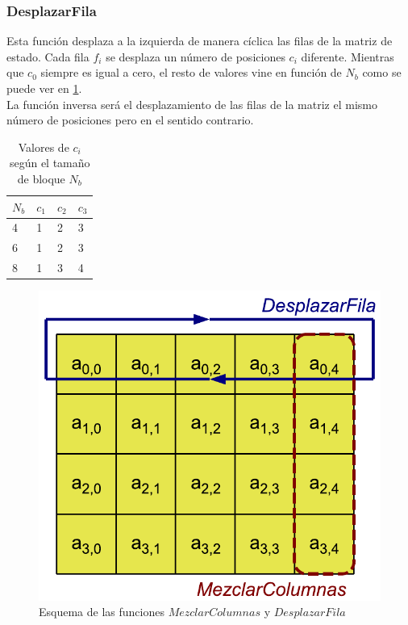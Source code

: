 	\subsubsection{DesplazarFila}
		Esta función desplaza a la izquierda de manera cíclica las filas de la matriz de estado. Cada fila $f_i$ se desplaza un número de posiciones $c_i$ diferente. Mientras que $c_0$ siempre es igual a cero, el resto de valores vine en función de $N_b$ como se puede ver en \ref{ciennb}.\\
		La función inversa será el desplazamiento de las filas de la matriz el mismo número de posiciones pero en el sentido contrario.

		\begin{table}[htb]
			\begin{center}
				\begin{tabular}{| l | l | l | l |}
						\hline
						$N_b$ & $c_1$ & $c_2$ & $c_3$\\ \hline
						4 & 1 & 2 & 3\\ \hline 
						6 & 1 & 2 & 3\\ \hline 
						8 & 1 & 3 & 4\\ \hline 
				\end{tabular}
				\caption{Valores de $c_i$ según el tamaño de bloque $N_b$}
				\label{ciennb}
			\end{center}
		\end{table}

		\begin{figure}[htb]
			\centering
			\includegraphics[scale=0.4]{imagenes/aesdesplazarmezclar.png} 
			\caption{Esquema de las funciones $MezclarColumnas$ y $DesplazarFila$ \cite{En2011}}
			\label{desplazarymezclar}
		\end{figure}
